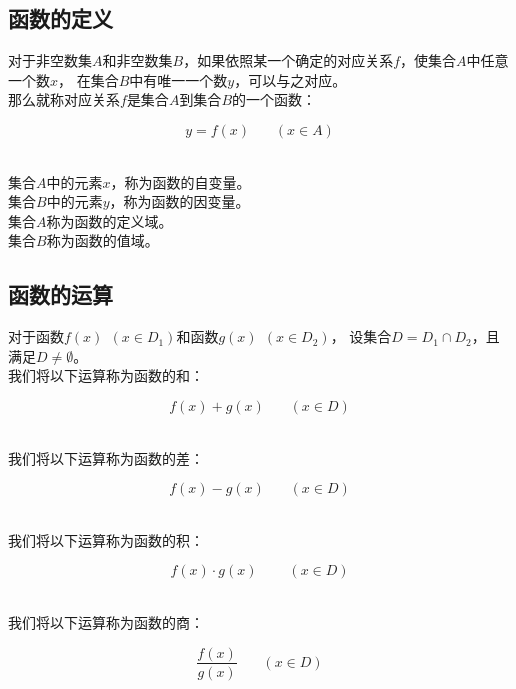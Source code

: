 \documentclass[UTF8]{ctexart}
\begin{document}
\subsection{函数的定义}
    对于非空数集$A$和非空数集$B$，如果依照某一个确定的对应关系$f$，使集合$A$中任意一个数$x$，
    在集合$B$中有唯一一个数$y$，可以与之对应。\\[3mm]
    那么就称对应关系$f$是集合$A$到集合$B$的一个函数：
    \begin{large}
        \begin{equation*}
            y=f(x)~~~~~~~~(x\in A)
        \end{equation*}
    \end{large}\\
    集合$A$中的元素$x$，称为函数的自变量。\\[3mm]
    集合$B$中的元素$y$，称为函数的因变量。\\[3mm]
    集合$A$称为函数的定义域。\\[3mm]
    集合$B$称为函数的值域。\\

\subsection{函数的运算}
    对于函数$f(x)~~(x\in D_1)$和函数$g(x)~~(x\in D_2)$，
    设集合$D=D_1\cap D_2$，且满足$D\neq\emptyset$。\\[3mm]
    我们将以下运算称为函数的和：
    \begin{large}
        \begin{equation*}
            f(x)+g(x)~~~~~~~~(x\in D)
        \end{equation*}
    \end{large}\\
    我们将以下运算称为函数的差：
    \begin{large}
        \begin{equation*}
            f(x)-g(x)~~~~~~~~(x\in D)
        \end{equation*}
    \end{large}\\
    我们将以下运算称为函数的积：
    \begin{large}
        \begin{equation*}
            f(x)\cdot g(x)~~~~~~~~~~(x\in D)
        \end{equation*}
    \end{large}\\
    我们将以下运算称为函数的商：\vspace{3pt}
    \begin{large}
        \begin{equation*}
            \frac{f(x)}{g(x)}~~~~~~~~(x\in D)
        \end{equation*}
    \end{large}\\
\end{document}
